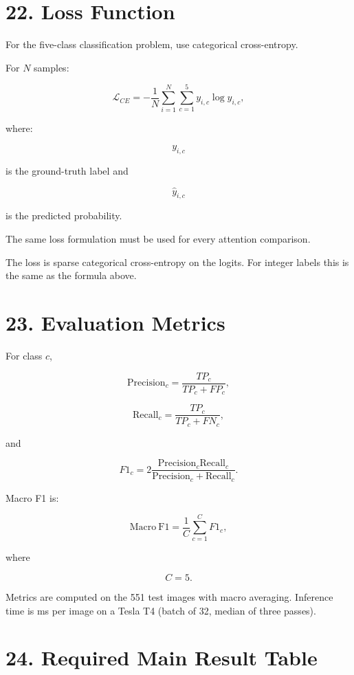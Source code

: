 \documentclass[10pt]{article}
\begin{document}
\section*{22. Loss Function}

For the five-class classification problem, use categorical cross-entropy.

For $N$ samples:

\[
\mathcal{L}_{CE}
=
-
\frac{1}{N}
\sum_{i=1}^{N}
\sum_{c=1}^{5}
y_{i,c}
\log
\widehat{y}_{i,c},
\]

where:

\[
y_{i,c}
\]

is the ground-truth label and

\[
\widehat{y}_{i,c}
\]

is the predicted probability.

The same loss formulation must be used for every attention comparison.

The loss is sparse categorical cross-entropy on the logits. For integer labels this is the same as the formula above.

\section*{23. Evaluation Metrics}

For class $c$,

\[
\mathrm{Precision}_c
=
\frac{TP_c}
{TP_c+FP_c},
\]

\[
\mathrm{Recall}_c
=
\frac{TP_c}
{TP_c+FN_c},
\]

and

\[
F1_c
=
2
\frac{
\mathrm{Precision}_c
\mathrm{Recall}_c
}{
\mathrm{Precision}_c+
\mathrm{Recall}_c
}.
\]

Macro F1 is:

\[
\mathrm{Macro\ F1}
=
\frac{1}{C}
\sum_{c=1}^{C}
F1_c,
\]

where

\[
C=5.
\]

Metrics are computed on the 551 test images with macro averaging. Inference time is ms per image on a Tesla T4 (batch of 32, median of three passes).

\section*{24. Required Main Result Table}
\end{document}
